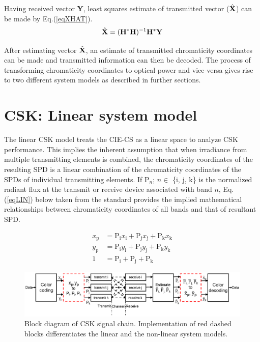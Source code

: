 \documentclass[10pt,letterpaper]{article}
\newcommand{\vm}[1]{{\bf{#1}}}
\begin{document}
Having received vector \vm{Y}, least squares estimate of transmitted vector ($\hat{\vm{X}}$) can be made by Eq.(\ref{eqXHAT}).
\begin{equation}
	\hat{\vm{X}} = (\vm{H}^{*}\vm{H})^{-1}\vm{H}^{*}\vm{Y}
	\label{eqXHAT}
\end{equation}

After estimating vector $\hat{\vm{X}}$, an estimate of transmitted chromaticity coordinates can be made and transmitted information can then be decoded. The process of transforming chromaticity coordinates to optical power and vice-versa gives rise to two different system models as described in further sections.

\section{CSK: Linear system model}\label{sCSKL}

The linear CSK model treats the CIE-CS as a linear space to analyze CSK performance. This implies the inherent assumption that when irradiance from multiple transmitting elements is combined, the chromaticity coordinates of the resulting SPD is a linear combination of the chromaticity coordinates of the SPDs of individual transmitting elements. If P$_{n}$; $n\in$ \{i, j, k\} is the normalized radiant flux at the transmit or receive device associated with band $n$, Eq.(\ref{eqLIN}) below taken from the standard provides the implied mathematical relationships between chromaticity coordinates of all bands and that of resultant SPD.

\begin{equation}
	\begin{aligned}
	x_{\text{p}} &= \text{P}_{\text{i}}x_{\text{i}} + \text{P}_{\text{j}}x_{\text{j}} + \text{P}_{\text{k}}x_{\text{k}}\\
	y_{\text{p}} &= \text{P}_{\text{i}}y_{\text{i}} + \text{P}_{\text{j}}y_{\text{j}} + \text{P}_{\text{k}}y_{\text{k}}\\
	1 &= \text{P}_{\text{i}} + \text{P}_{\text{j}} + \text{P}_{\text{k}}
\end{aligned}
\label{eqLIN}
\end{equation}

\begin{figure}[t]
	\centering
		\includegraphics[trim={2.34in 2.78in 1.76in 2.47in}, clip=true, width=5.25in]{CSKBlockDiagram.eps}
	\caption{Block diagram of CSK signal chain. Implementation of red dashed blocks differentiates the linear and the non-linear system models.}
	\label{figCSKBD}
\end{figure}
\end{document}
